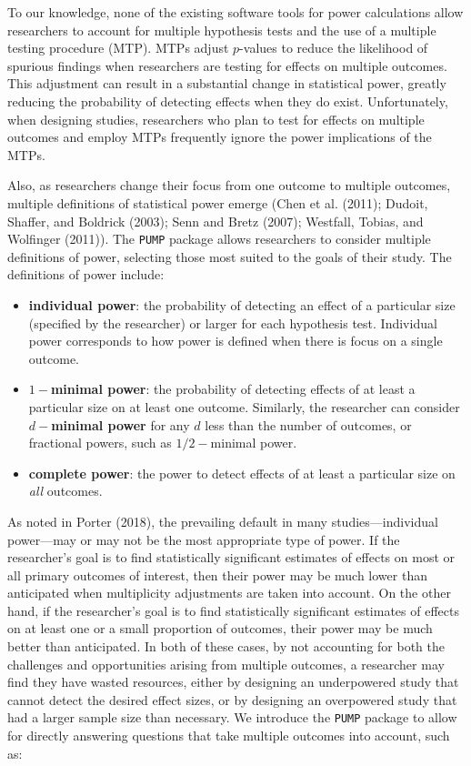 \documentclass{article}
\providecommand{\tightlist}{%
  \setlength{\itemsep}{0pt}\setlength{\parskip}{0pt}}
\begin{document}
To our knowledge, none of the existing software tools for power
calculations allow researchers to account for multiple hypothesis tests
and the use of a multiple testing procedure (MTP). MTPs adjust
\(p\)-values to reduce the likelihood of spurious findings when
researchers are testing for effects on multiple outcomes. This
adjustment can result in a substantial change in statistical power,
greatly reducing the probability of detecting effects when they do
exist. Unfortunately, when designing studies, researchers who plan to
test for effects on multiple outcomes and employ MTPs frequently ignore
the power implications of the MTPs.

Also, as researchers change their focus from one outcome to multiple
outcomes, multiple definitions of statistical power emerge (Chen et al.
(2011); Dudoit, Shaffer, and Boldrick (2003); Senn and Bretz (2007);
Westfall, Tobias, and Wolfinger (2011)). The \texttt{PUMP} package
allows researchers to consider multiple definitions of power, selecting
those most suited to the goals of their study. The definitions of power
include:

\begin{itemize}
\tightlist
\item
  \textbf{individual power}: the probability of detecting an effect of a
  particular size (specified by the researcher) or larger for each
  hypothesis test. Individual power corresponds to how power is defined
  when there is focus on a single outcome.
\item
  \textbf{\(1-\)minimal power}: the probability of detecting effects of
  at least a particular size on at least one outcome. Similarly, the
  researcher can consider \textbf{\(d-\)minimal power} for any \(d\)
  less than the number of outcomes, or fractional powers, such as
  \(1/2-\)minimal power.
\item
  \textbf{complete power}: the power to detect effects of at least a
  particular size on \emph{all} outcomes.
\end{itemize}

As noted in Porter (2018), the prevailing default in many
studies---individual power---may or may not be the most appropriate type
of power. If the researcher's goal is to find statistically significant
estimates of effects on most or all primary outcomes of interest, then
their power may be much lower than anticipated when multiplicity
adjustments are taken into account. On the other hand, if the
researcher's goal is to find statistically significant estimates of
effects on at least one or a small proportion of outcomes, their power
may be much better than anticipated. In both of these cases, by not
accounting for both the challenges and opportunities arising from
multiple outcomes, a researcher may find they have wasted resources,
either by designing an underpowered study that cannot detect the desired
effect sizes, or by designing an overpowered study that had a larger
sample size than necessary. We introduce the \texttt{PUMP} package to
allow for directly answering questions that take multiple outcomes into
account, such as:
\end{document}
